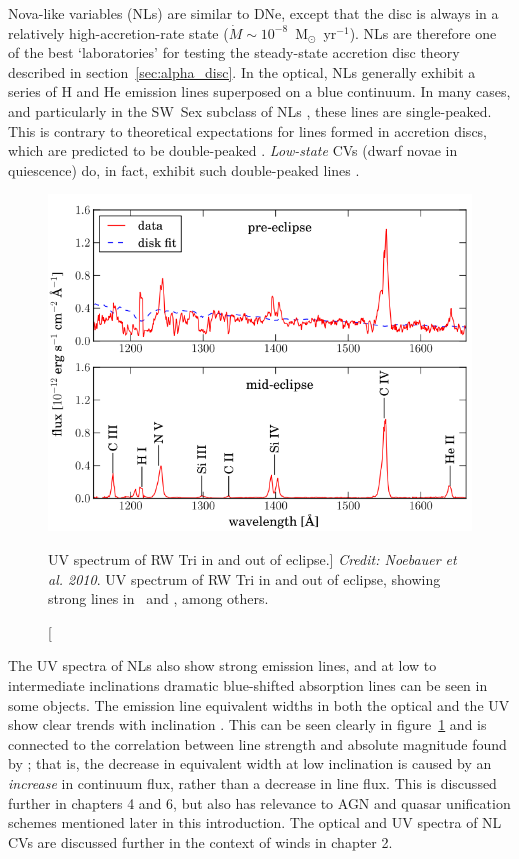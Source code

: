 Nova-like variables (NLs) are similar to DNe,
except that the disc is always in a relatively 
high-accretion-rate state ($\dot{M} \sim 10^{-8}$~M$_{\odot}$~yr$^{-1}$).
NLs are therefore one of the best `laboratories' for testing the steady-state
accretion disc theory described in section~\ref{sec:alpha_disc}.
In the optical, NLs generally exhibit a series of H and He emission 
lines superposed on a blue continuum. In many
cases, and particularly in the SW~Sex subclass of NLs
\citep{HSK86,DR95}, these lines are single-peaked. This is contrary to
theoretical expectations for lines formed in accretion discs, which
are predicted to be double-peaked \citep{smak1981, hornemarsh1986}. 
{\em Low-state} CVs (dwarf novae in quiescence) do, in fact,
exhibit such double-peaked lines \citep{marshhorne1990}. 

\nocite{dhillon1996,hessman1984}
\begin{figure}
\centering
\includegraphics[width=1.0\textwidth]{figures/02-outflows/rwtri_noe.png}
\caption
[UV spectrum of RW Tri in and out of eclipse.]
{
{\sl Credit: Noebauer et al. 2010}.
UV spectrum of RW Tri in and out of eclipse, showing strong lines in 
\civfull\ and \la, among others.
} 
\label{fig:NL_spec}
\end{figure}


The UV spectra of NLs also show strong emission lines, and at 
low to intermediate inclinations dramatic blue-shifted absorption lines
can be seen in some objects. The emission line equivalent widths
in both the optical and the UV show clear trends with 
inclination \citep{hessman1984,echevarria1988,noebauer}. 
This can be seen clearly in figure~\ref{fig:NL_spec} and is connected to
the correlation between line strength and absolute magnitude 
found by \cite{patterson1984};
that is, the decrease in equivalent width at low inclination is caused by an {\em increase} in continuum flux, rather than a decrease in line flux. 
This is discussed further in chapters 4 and 6, but also has 
relevance to AGN and quasar unification schemes mentioned later in this introduction.
The optical and UV spectra of NL CVs are discussed further
in the context of winds in chapter 2.

